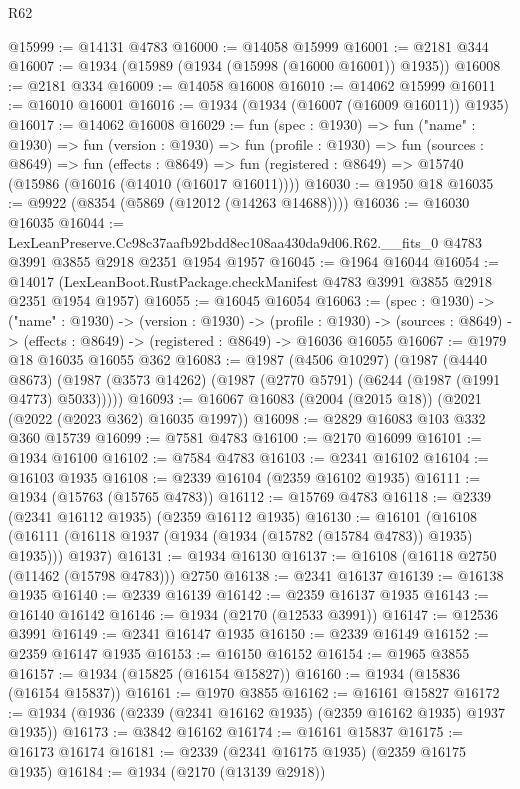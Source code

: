 \begin{lexlean}{R62}
\begin{coremodule}
@15999 := @14131 @4783
@16000 := @14058 @15999
@16001 := @2181 @344
@16007 := @1934 (@15989 (@1934 (@15998 (@16000 @16001)) @1935))
@16008 := @2181 @334
@16009 := @14058 @16008
@16010 := @14062 @15999
@16011 := @16010 @16001
@16016 := @1934 (@1934 (@16007 (@16009 @16011)) @1935)
@16017 := @14062 @16008
@16029 := fun (spec : @1930) =>
  fun ("name" : @1930) =>
  fun (version : @1930) =>
  fun (profile : @1930) =>
  fun (sources : @8649) =>
  fun (effects : @8649) =>
  fun (registered : @8649) => @15740 (@15986 (@16016 (@14010 (@16017 @16011))))
@16030 := @1950 @18
@16035 := @9922 (@8354 (@5869 (@12012 (@14263 @14688))))
@16036 := @16030 @16035
@16044 := LexLeanPreserve.Cc98c37aafb92bdd8ec108aa430da9d06.R62.__fits_0
    @4783
    @3991
    @3855
    @2918
    @2351
    @1954
    @1957
@16045 := @1964 @16044
@16054 := @14017 (LexLeanBoot.RustPackage.checkManifest @4783 @3991 @3855 @2918 @2351 @1954 @1957)
@16055 := @16045 @16054
@16063 := (spec : @1930) ->
  ("name" : @1930) ->
  (version : @1930) ->
  (profile : @1930) ->
  (sources : @8649) -> (effects : @8649) -> (registered : @8649) -> @16036 @16055
@16067 := @1979 @18 @16035 @16055 @362
@16083 := @1987
    (@4506 @10297)
    (@1987
      (@4440 @8673)
      (@1987 (@3573 @14262) (@1987 (@2770 @5791) (@6244 (@1987 (@1991 @4773) @5033)))))
@16093 := @16067 @16083 (@2004 (@2015 @18)) (@2021 (@2022 (@2023 @362) @16035 @1997))
@16098 := @2829 @16083 @103 @332 @360 @15739
@16099 := @7581 @4783
@16100 := @2170 @16099
@16101 := @1934 @16100
@16102 := @7584 @4783
@16103 := @2341 @16102
@16104 := @16103 @1935
@16108 := @2339 @16104 (@2359 @16102 @1935)
@16111 := @1934 (@15763 (@15765 @4783))
@16112 := @15769 @4783
@16118 := @2339 (@2341 @16112 @1935) (@2359 @16112 @1935)
@16130 := @16101
    (@16108 (@16111 (@16118 @1937 (@1934 (@1934 (@15782 (@15784 @4783)) @1935) @1935))) @1937)
@16131 := @1934 @16130
@16137 := @16108 (@16118 @2750 (@11462 (@15798 @4783))) @2750
@16138 := @2341 @16137
@16139 := @16138 @1935
@16140 := @2339 @16139
@16142 := @2359 @16137 @1935
@16143 := @16140 @16142
@16146 := @1934 (@2170 (@12533 @3991))
@16147 := @12536 @3991
@16149 := @2341 @16147 @1935
@16150 := @2339 @16149
@16152 := @2359 @16147 @1935
@16153 := @16150 @16152
@16154 := @1965 @3855
@16157 := @1934 (@15825 (@16154 @15827))
@16160 := @1934 (@15836 (@16154 @15837))
@16161 := @1970 @3855
@16162 := @16161 @15827
@16172 := @1934 (@1936 (@2339 (@2341 @16162 @1935) (@2359 @16162 @1935) @1937 @1935))
@16173 := @3842 @16162
@16174 := @16161 @15837
@16175 := @16173 @16174
@16181 := @2339 (@2341 @16175 @1935) (@2359 @16175 @1935)
@16184 := @1934 (@2170 (@13139 @2918))

\end{coremodule}
\end{lexlean}
